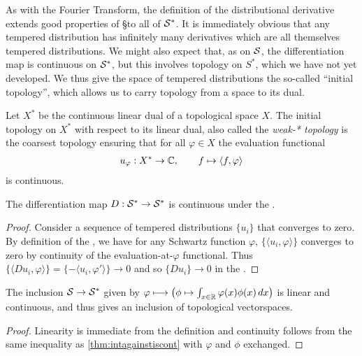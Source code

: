     As with the Fourier Transform, the definition of the distributional derivative extends good properties of \S to all of $\S^*$.
    It is immediately obvious that any tempered distribution has infinitely many derivatives which are all themselves tempered distributions.
    We might also expect that, as on $\S$, the differentiation map is continuous on $\S^*$, but this involves topology on $S^*$, which we have not yet developed.
    We thus give the space of tempered distributions the so-called ``initial topology'', which allows us to carry topology from a space to its dual.
    \begin{defn}
      Let $X^*$ be the continuous linear dual of a topological space $X$.
      The initial topology on $X^*$ with respect to its linear dual, also called the \emph{weak-* topology} is the coarsest topology ensuring that for all $\varphi\in X$ the evaluation functional
      \begin{gather*}
        u_\varphi: X^*\rightarrow\C, \qquad f\mapsto\langle f,\varphi\rangle
      \end{gather*}
      is continuous.
    \end{defn}

    \begin{claim}
      The differentiation map $D:\SS\rightarrow\SS$ is continuous under the \ws.
    \end{claim}
    \begin{proof}
      Consider a sequence of tempered distributions $\{u_i\}$ that converges to zero.
      By definition of the \ws, we have for any Schwartz function $\varphi$, $\{\langle u_i,\varphi\rangle\}$ converges to zero by continuity of the evaluation-at-$\varphi$ functional.
      Thus $ \{\langle Du_i, \varphi\rangle\} = \{-\langle u_i, \varphi'\rangle\} \rightarrow 0 $ and so $\{Du_i\}\rightarrow 0$ in the \ws.
    \end{proof}

    \begin{thm}
      The inclusion $\S\rightarrow\SS$ given by $\varphi\longmapsto\left( \phi\mapsto \int_{x\in\R} \varphi(x)\phi(x)\,dx \right)$ is linear and continuous, and thus gives an inclusion of topological vectorspaces.
    \end{thm}
    \begin{proof}
      Linearity is immediate from the definition and continuity follows from the same inequality as \cref{thm:intagainstiscont} with $\varphi$ and $\phi$ exchanged.
    \end{proof}

